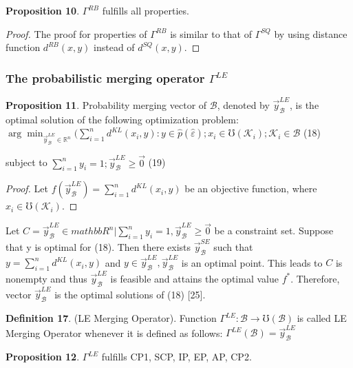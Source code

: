 \documentclass[]{iosart2c}
\begin{document}
\textbf{Proposition 10}. $\Gamma^{RB}$ fulfills all properties.

\begin{proof}The proof for properties of $\Gamma^{RB}$ is similar
to that of $\Gamma^{SQ}$ by using distance function $d^{RB}(x, y)$
instead of $d^{SQ}(x, y)$.
\end{proof}
\subsubsection{The probabilistic merging operator $\Gamma^{LE}$}

\textbf{Proposition 11}. Probability merging vector of $\mathcal{B}$,
denoted by $\vec{y}^{LE}_\mathcal{B}$, is the optimal solution of the following optimization problem:
$\arg \min_{\vec{y}^{LE}_\mathcal{B} \in \mathbb{R}^n} (\sum^n_{i=1} d^{KL}(x_i, y) : 
y \in \hat{p}(\hat{\varepsilon}); x_i \in \mho(\mathcal{K}_i);\mathcal{K}_i \in \mathcal{B}$ (18)

subject to $\sum^n_{i=1} y_i = 1; \vec{y}^{LE}_\mathcal{B} \geq \vec{0}$ (19)

\begin{proof}Let $f(\vec{y}^{LE}_\mathcal{B} ) = \sum^n_{i=1} d^{KL}(x_i, y)$ be an objective function, where $x_i \in \mho(\mathcal{K}_i)$.
\end{proof}
Let $C = {\vec{y}^{LE}_\mathcal{B} \in mathbb{R}^n|\sum^n_{i=1} y_i = 1, \vec{y}^{LE}_\mathcal{B} \geq \vec{0} }$ be a
constraint set. Suppose that y is optimal for (18).
Then there exists $\vec{y}^{SE}_\mathcal{B}$ such that $y = \sum^n_{i=1} d^{KL}(x_i, y)$
and $y \in \vec{y}^{LE}_\mathcal{B} , \vec{y}^{LE}_\mathcal{B}$ is an optimal point. This leads to
$C$ is nonempty and thus $\vec{y}^{LE}_\mathcal{B}$ is feasible and attains
the optimal value $f^*$. Therefore, vector $\vec{y}^{LE}_\mathcal{B}$ is the
optimal solutions of (18) [25].

\textbf{Definition 17}. (LE Merging Operator). Function 
$\Gamma^{LE} : \mathcal{B} \to \mho(\mathcal{B})$ is called LE Merging Operator
whenever it is defined as follows: $\Gamma^{LE}(\mathcal{B}) = \vec{y}^{LE}_\mathcal{B}$

\textbf{Proposition 12}. $\Gamma^{LE}$ fulfills CP1, SCP, IP, EP, AP, CP2.
\end{document}
